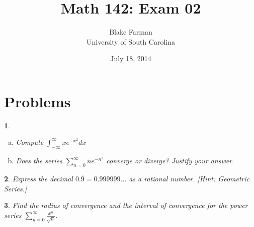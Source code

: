 \documentclass[12pt]{amsart}
\author{Blake Farman\\University of South Carolina}
\title{Math 142: Exam 02}
\date{July 18, 2014}
\begin{document}
\maketitle

\begin{center}
\end{center}

\vspace{0.2in}
\vspace{0.2in}

\theoremstyle{plain}
\newtheorem{thm}{}
\newtheorem{lem}{Lemma}
\theoremstyle{definition}
\newtheorem{defn}{Definition}

\newpage

\section{Problems}

\begin{thm}
  \begin{enumerate}[(a)]
  \item
    Compute $\displaystyle{\int_{-\infty}^{\infty} xe^{-x^2}}dx$
    \vspace{4in}
  \item
    Does the series $\displaystyle{\sum_{n=0}^{\infty} ne^{-n^2}}$ converge or diverge?  
    Justify your answer.
  \end{enumerate}
\end{thm}

\newpage

\begin{thm}
  Express the decimal $0.\overline{9} = 0.999999\ldots$ as a rational number. [Hint: Geometric Series.]
\end{thm}

\newpage

\begin{thm}
  Find the radius of convergence and the interval of convergence for the power series $\displaystyle{\sum_{n=0}^\infty \frac{x^n}{\sqrt{n}}}$.
\end{thm}

\newpage
\end{document}
